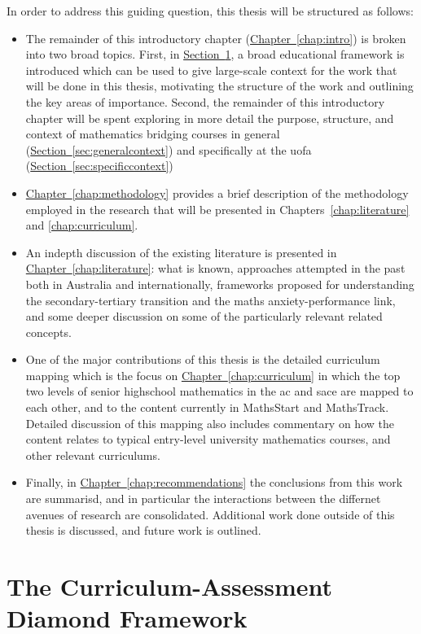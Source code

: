 \documentclass[twoside,12pt,a4paper]{report}
\newcommand{\refchap}[1]{\hyperref[chap:#1]{Chapter~\ref{chap:#1}}}
\newcommand{\refsec}[1]{\hyperref[sec:#1]{Section~\ref{sec:#1}}}
\begin{document}
In order to address this guiding question, this thesis will be structured as follows:
\begin{itemize}
	\item The remainder of this introductory chapter (\refchap{intro}) is broken into two broad topics. First, in \refsec{framework}, a broad educational framework is introduced which can be used to give large-scale context for the work that will be done in this thesis, motivating the structure of the work and outlining the key areas of importance. Second, the remainder of this introductory chapter will be spent exploring in more detail the purpose, structure, and context of mathematics bridging courses in general (\refsec{generalcontext}) and specifically at the \gls{uofa} (\refsec{specificcontext})
	\item \refchap{methodology} provides a brief description of the methodology employed in the research that will be presented in Chapters~\ref{chap:literature} and \ref{chap:curriculum}.
	\item An indepth discussion of the existing literature is presented in \refchap{literature}: what is known, approaches attempted in the past both in Australia and internationally, frameworks proposed for understanding the secondary-tertiary transition and the maths anxiety-performance link, and some deeper discussion on some of the particularly relevant related concepts.
	\item One of the major contributions of this thesis is the detailed curriculum mapping which is the focus on \refchap{curriculum} in which the top two levels of senior highschool mathematics in the \gls{ac} and \gls{sace} are mapped to each other, and to the content currently in MathsStart and MathsTrack. Detailed discussion of this mapping also includes commentary on how the content relates to typical entry-level university mathematics courses, and other relevant curriculums. 
	\item Finally, in \refchap{recommendations} the conclusions from this work are summarisd, and in particular the interactions between the differnet avenues of research are consolidated. Additional work done outside of this thesis is discussed, and future work is outlined.
\end{itemize}


\section{The Curriculum-Assessment Diamond Framework}
\label{sec:framework}
\end{document}
